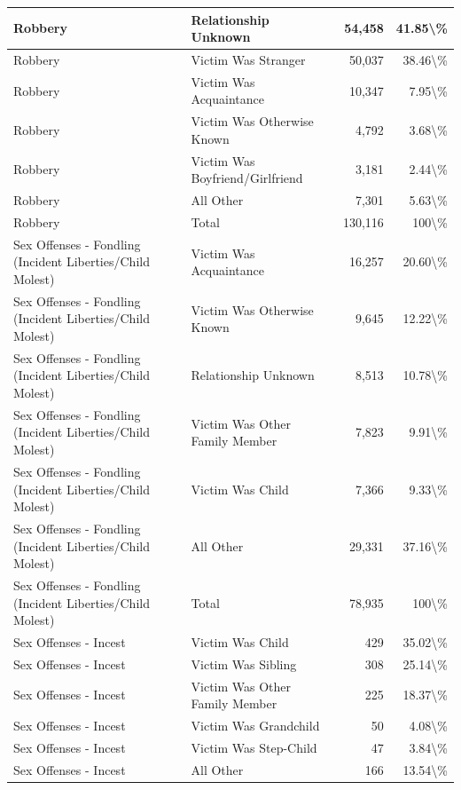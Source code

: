 \documentclass[
]{krantz}
\begin{document}
\begin{longtable}[t]{l|l|r|r}
\hline
Robbery & Relationship Unknown & 54,458 & 41.85\textbackslash{}\%\\
\hline
Robbery & Victim Was Stranger & 50,037 & 38.46\textbackslash{}\%\\
\hline
Robbery & Victim Was Acquaintance & 10,347 & 7.95\textbackslash{}\%\\
\hline
Robbery & Victim Was Otherwise Known & 4,792 & 3.68\textbackslash{}\%\\
\hline
Robbery & Victim Was Boyfriend/Girlfriend & 3,181 & 2.44\textbackslash{}\%\\
\hline
Robbery & All Other & 7,301 & 5.63\textbackslash{}\%\\
\hline
Robbery & Total & 130,116 & 100\textbackslash{}\%\\
\hline
Sex Offenses - Fondling (Incident Liberties/Child Molest) & Victim Was Acquaintance & 16,257 & 20.60\textbackslash{}\%\\
\hline
Sex Offenses - Fondling (Incident Liberties/Child Molest) & Victim Was Otherwise Known & 9,645 & 12.22\textbackslash{}\%\\
\hline
Sex Offenses - Fondling (Incident Liberties/Child Molest) & Relationship Unknown & 8,513 & 10.78\textbackslash{}\%\\
\hline
Sex Offenses - Fondling (Incident Liberties/Child Molest) & Victim Was Other Family Member & 7,823 & 9.91\textbackslash{}\%\\
\hline
Sex Offenses - Fondling (Incident Liberties/Child Molest) & Victim Was Child & 7,366 & 9.33\textbackslash{}\%\\
\hline
Sex Offenses - Fondling (Incident Liberties/Child Molest) & All Other & 29,331 & 37.16\textbackslash{}\%\\
\hline
Sex Offenses - Fondling (Incident Liberties/Child Molest) & Total & 78,935 & 100\textbackslash{}\%\\
\hline
Sex Offenses - Incest & Victim Was Child & 429 & 35.02\textbackslash{}\%\\
\hline
Sex Offenses - Incest & Victim Was Sibling & 308 & 25.14\textbackslash{}\%\\
\hline
Sex Offenses - Incest & Victim Was Other Family Member & 225 & 18.37\textbackslash{}\%\\
\hline
Sex Offenses - Incest & Victim Was Grandchild & 50 & 4.08\textbackslash{}\%\\
\hline
Sex Offenses - Incest & Victim Was Step-Child & 47 & 3.84\textbackslash{}\%\\
\hline
Sex Offenses - Incest & All Other & 166 & 13.54\textbackslash{}\%\\

\end{longtable}
\end{document}
